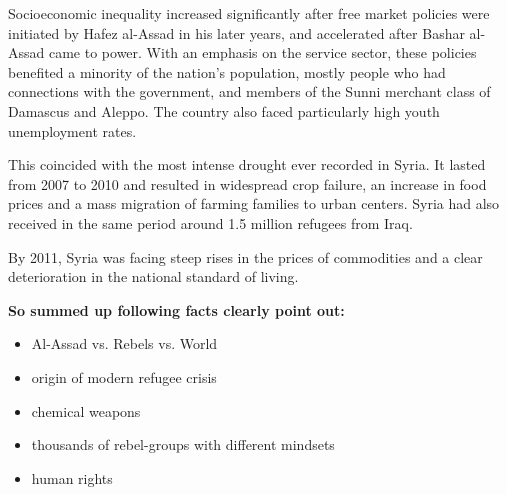 Socioeconomic inequality increased significantly after free market policies were initiated by Hafez al-Assad in his later years, and accelerated after Bashar al-Assad came to power. With an emphasis on the service sector, these policies benefited a minority of the nation's population, mostly people who had connections with the government, and members of the Sunni merchant class of Damascus and Aleppo. The country also faced particularly high youth unemployment rates.

This coincided with the most intense drought ever recorded in Syria. It lasted from 2007 to 2010 and resulted in widespread crop failure, an increase in food prices and a mass migration of farming families to urban centers. Syria had also received in the same period around 1.5 million refugees from Iraq.

By 2011, Syria was facing steep rises in the prices of commodities and a clear deterioration in the national standard of living.

\textbf{So summed up following facts clearly point out:}
\begin{itemize}
	\item Al-Assad vs. Rebels vs. World
	\item origin of modern refugee crisis
	\item chemical weapons
	\item thousands of rebel-groups with different mindsets
	\item human rights
\end{itemize}



